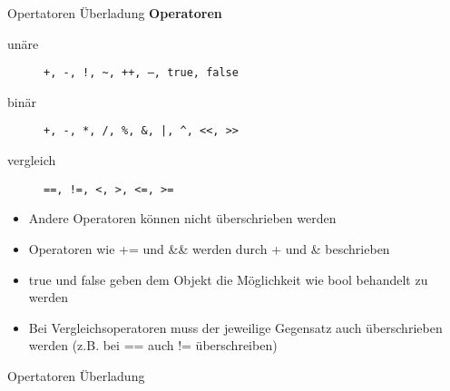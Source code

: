 \begin{frame}{Opertatoren Überladung}
	\textbf{Operatoren}\\
	\begin{description}
		\item[unäre] \texttt{\alert{+}, \alert{-}, \alert{!}, \alert{\texttt{\~}}, \alert{++}, \alert{--}, \alert{true}, \alert{false}}
		\item[binär] \texttt{\alert{+}, \alert{-}, \alert{*}, \alert{/}, \alert{\%}, \alert{\&}, \alert{|}, \alert{\texttt{\^}}, \alert{<<}, \alert{>>}}
		\item[vergleich]  \texttt{\alert{==}, \alert{!=}, \alert{<}, \alert{>}, \alert{<=}, \alert{>=}}
	\end{description}
	\begin{itemize}
		\item Andere Operatoren können nicht überschrieben werden
		\item Operatoren wie \alert{+=} und \alert{\&\&} werden durch \alert{+} und \alert{\&} beschrieben
		\item \alert{true} und \alert{false} geben dem Objekt die Möglichkeit wie bool behandelt zu werden
		\item Bei Vergleichsoperatoren muss der jeweilige Gegensatz auch überschrieben werden (z.B. bei \alert{==} auch \alert{!=} überschreiben)
	\end{itemize}
\end{frame}

\begin{frame}{Opertatoren Überladung}
	
	
\end{frame}

